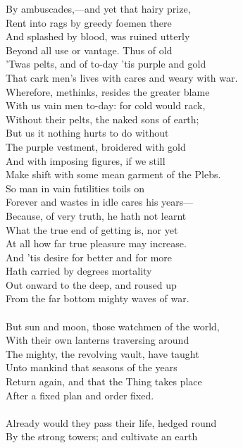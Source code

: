 By ambuscades,—and yet that hairy prize,\\
Rent into rags by greedy foemen there\\
And splashed by blood, was ruined utterly\\
Beyond all use or vantage. Thus of old\\
'Twas pelts, and of to-day 'tis purple and gold\\
That cark men's lives with cares and weary with war.\\
Wherefore, methinks, resides the greater blame\\
With us vain men to-day: for cold would rack,\\
Without their pelts, the naked sons of earth;\\
But us it nothing hurts to do without\\
The purple vestment, broidered with gold\\
And with imposing figures, if we still\\
Make shift with some mean garment of the Plebs.\\
So man in vain futilities toils on\\
Forever and wastes in idle cares his years—\\
Because, of very truth, he hath not learnt\\
What the true end of getting is, nor yet\\
At all how far true pleasure may increase.\\
And 'tis desire for better and for more\\
Hath carried by degrees mortality\\
Out onward to the deep, and roused up\\
From the far bottom mighty waves of war.\\
\\
But sun and moon, those watchmen of the world,\\
With their own lanterns traversing around\\
The mighty, the revolving vault, have taught\\
Unto mankind that seasons of the years\\
Return again, and that the Thing takes place\\
After a fixed plan and order fixed.\\
\\
Already would they pass their life, hedged round\\
By the strong towers; and cultivate an earth\\
